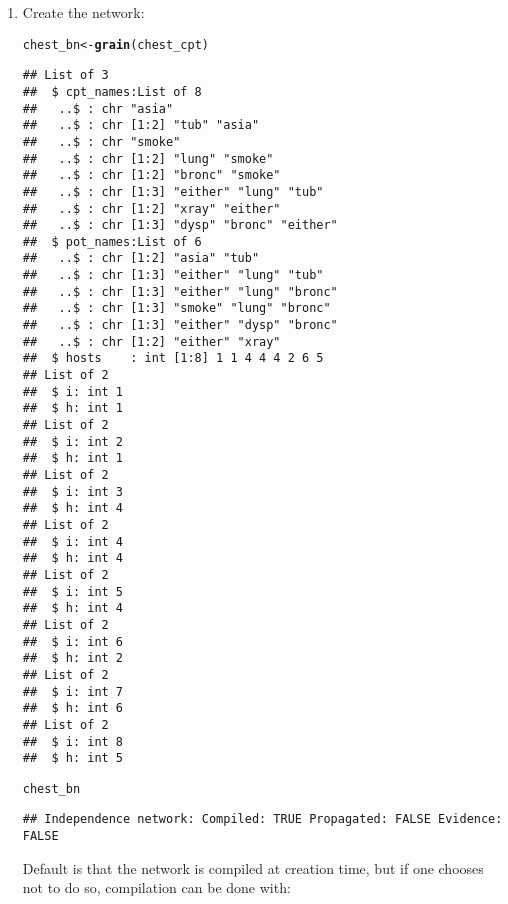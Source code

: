 \documentclass[10pt]{article}\usepackage[]{graphicx}\usepackage[]{xcolor}
\makeatletter
\newcommand{\hlstd}[1]{\textcolor[rgb]{0.345,0.345,0.345}{#1}}%
\newcommand{\hlkwb}[1]{\textcolor[rgb]{0.69,0.353,0.396}{#1}}%
\newcommand{\hlkwd}[1]{\textcolor[rgb]{0.737,0.353,0.396}{\textbf{#1}}}%
\newenvironment{kframe}{%
 \def\at@end@of@kframe{}%
 \ifinner\ifhmode%
  \def\at@end@of@kframe{\end{minipage}}%
  \begin{minipage}{\columnwidth}%
 \fi\fi%
 \def\FrameCommand##1{\hskip\@totalleftmargin \hskip-\fboxsep
 \colorbox{shadecolor}{##1}\hskip-\fboxsep
     \hskip-\linewidth \hskip-\@totalleftmargin \hskip\columnwidth}%
 \MakeFramed {\advance\hsize-\width
   \@totalleftmargin\z@ \linewidth\hsize
   \@setminipage}}%
 {\par\unskip\endMakeFramed%
 \at@end@of@kframe}
\newenvironment{knitrout}{}{} %
\makeatother
\begin{document}
\begin{enumerate}
\item Create the network:
\begin{knitrout}
\color{fgcolor}\begin{kframe}
\begin{alltt}
\hlstd{chest_bn} \hlkwb{<-} \hlkwd{grain}\hlstd{(chest_cpt)}
\end{alltt}
\begin{verbatim}
## List of 3
##  $ cpt_names:List of 8
##   ..$ : chr "asia"
##   ..$ : chr [1:2] "tub" "asia"
##   ..$ : chr "smoke"
##   ..$ : chr [1:2] "lung" "smoke"
##   ..$ : chr [1:2] "bronc" "smoke"
##   ..$ : chr [1:3] "either" "lung" "tub"
##   ..$ : chr [1:2] "xray" "either"
##   ..$ : chr [1:3] "dysp" "bronc" "either"
##  $ pot_names:List of 6
##   ..$ : chr [1:2] "asia" "tub"
##   ..$ : chr [1:3] "either" "lung" "tub"
##   ..$ : chr [1:3] "either" "lung" "bronc"
##   ..$ : chr [1:3] "smoke" "lung" "bronc"
##   ..$ : chr [1:3] "either" "dysp" "bronc"
##   ..$ : chr [1:2] "either" "xray"
##  $ hosts    : int [1:8] 1 1 4 4 4 2 6 5
## List of 2
##  $ i: int 1
##  $ h: int 1
## List of 2
##  $ i: int 2
##  $ h: int 1
## List of 2
##  $ i: int 3
##  $ h: int 4
## List of 2
##  $ i: int 4
##  $ h: int 4
## List of 2
##  $ i: int 5
##  $ h: int 4
## List of 2
##  $ i: int 6
##  $ h: int 2
## List of 2
##  $ i: int 7
##  $ h: int 6
## List of 2
##  $ i: int 8
##  $ h: int 5
\end{verbatim}
\begin{alltt}
\hlstd{chest_bn}
\end{alltt}
\begin{verbatim}
## Independence network: Compiled: TRUE Propagated: FALSE Evidence: FALSE
\end{verbatim}
\end{kframe}
\end{knitrout}

Default is that the network is compiled at creation time, but if one
chooses not to do so, compilation can be done with:


\end{enumerate}
\end{document}
